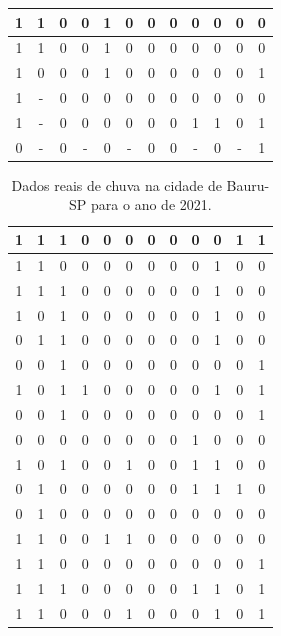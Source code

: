 \begin{table}[H]
\begin{tabular}{|c|c|c|c|c|c|c|c|c|c|c|c|}
1 & 1 & 0 & 0 & 1 & 0 & 0 & 0 & 0 & 0 & 0 & 0 \\ \hline
1 & 1 & 0 & 0 & 1 & 0 & 0 & 0 & 0 & 0 & 0 & 0 \\ \hline
1 & 0 & 0 & 0 & 1 & 0 & 0 & 0 & 0 & 0 & 0 & 1 \\ \hline
1 & - & 0 & 0 & 0 & 0 & 0 & 0 & 0 & 0 & 0 & 0 \\ \hline
1 & - & 0 & 0 & 0 & 0 & 0 & 0 & 1 & 1 & 0 & 1 \\ \hline
0 & - & 0 & - & 0 & - & 0 & 0 & - & 0 & - & 1 \\ \hline
\end{tabular}
\vspace*{15px}
\end{table}


\begin{table}[H]
\caption{Dados reais de chuva na cidade de Bauru-SP para o ano de 2021.}
\label{q.rinmet}
\centering
\begin{tabular}{|c|c|c|c|c|c|c|c|c|c|c|c|}
\hline
1 & 1 & 1 & 0 & 0 & 0 & 0 & 0 & 0 & 0 & 1 & 1 \\ \hline
1 & 1 & 0 & 0 & 0 & 0 & 0 & 0 & 0 & 1 & 0 & 0 \\ \hline
1 & 1 & 1 & 0 & 0 & 0 & 0 & 0 & 0 & 1 & 0 & 0 \\ \hline
1 & 0 & 1 & 0 & 0 & 0 & 0 & 0 & 0 & 1 & 0 & 0 \\ \hline
0 & 1 & 1 & 0 & 0 & 0 & 0 & 0 & 0 & 1 & 0 & 0 \\ \hline
0 & 0 & 1 & 0 & 0 & 0 & 0 & 0 & 0 & 0 & 0 & 1 \\ \hline
1 & 0 & 1 & 1 & 0 & 0 & 0 & 0 & 0 & 1 & 0 & 1 \\ \hline
0 & 0 & 1 & 0 & 0 & 0 & 0 & 0 & 0 & 0 & 0 & 1 \\ \hline
0 & 0 & 0 & 0 & 0 & 0 & 0 & 0 & 1 & 0 & 0 & 0 \\ \hline
1 & 0 & 1 & 0 & 0 & 1 & 0 & 0 & 1 & 1 & 0 & 0 \\ \hline
0 & 1 & 0 & 0 & 0 & 0 & 0 & 0 & 1 & 1 & 1 & 0 \\ \hline
0 & 1 & 0 & 0 & 0 & 0 & 0 & 0 & 0 & 0 & 0 & 0 \\ \hline
1 & 1 & 0 & 0 & 1 & 1 & 0 & 0 & 0 & 0 & 0 & 0 \\ \hline
1 & 1 & 0 & 0 & 0 & 0 & 0 & 0 & 0 & 0 & 0 & 1 \\ \hline
1 & 1 & 1 & 0 & 0 & 0 & 0 & 0 & 1 & 1 & 0 & 1 \\ \hline
1 & 1 & 0 & 0 & 0 & 1 & 0 & 0 & 0 & 1 & 0 & 1 \\ \hline

\end{tabular}
\end{table}
